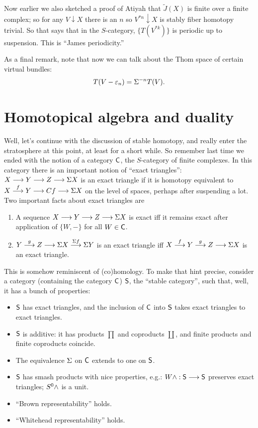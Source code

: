 Now earlier we also sketched a proof of Atiyah that $\widetilde J(X)$ is finite over a finite complex; so for any $V\downarrow X$ there is an $n$ so $V^{\ast n}\downarrow X$ is stably fiber homotopy trivial.  So that says that in the $S$-category, $\{T(V^{\ast k})\}$ is periodic up to suspension.  This is ``James periodicity.''

As a final remark, note that now we can talk about the Thom space of certain virtual bundles: \[T(V - \varepsilon_n) = \Sigma^{-n} T(V).\]

\fi
\BoxedNote{}
\section{Homotopical algebra and duality} %
\label{HomotopicalAlgebraAndDuality}
\ifx\OutputHomotopicalAlgebraAndDuality\undefined\else
Well, let's continue with the discussion of stable homotopy, and really enter the stratosphere at this point, at least for a short while.  So remember last time we ended with the notion of a category $\mathsf{C}$, the $S$-category of finite complexes.  In this category there is an important notion of ``exact triangles'': $X \longrightarrow Y \longrightarrow Z \longrightarrow \Sigma X$ is an exact triangle if it is homotopy equivalent to $X \stackrel{f}{\longrightarrow} Y \longrightarrow Cf \longrightarrow \Sigma X$ on the level of spaces, perhaps after suspending a lot.  Two important facts about exact triangles are
\begin{enumerate}
\item A sequence $X \longrightarrow Y \longrightarrow Z \longrightarrow \Sigma X$ is exact iff it remains exact after application of $\{W, -\}$ for all $W \in \mathsf{C}$.
\item $Y \stackrel{g}{\longrightarrow} Z \longrightarrow \Sigma X \stackrel{\Sigma f}{\longrightarrow} \Sigma Y$ is an exact triangle iff $X \stackrel{f}{\longrightarrow} Y \stackrel{g}{\longrightarrow} Z \longrightarrow \Sigma X$ is an exact triangle.
\end{enumerate}
This is somehow reminiscent of (co)homology. To make that hint precise, consider a category (containing the category $\mathsf{C}$) $\mathsf{S}$, the ``stable category'', such that, well, it has a bunch of properties:
\begin{itemize}
\item $\mathsf{S}$ has exact triangles, and the inclusion of $\mathsf{C}$ into $\mathsf{S}$ takes exact triangles to exact triangles.
\item $\mathsf{S}$ is additive: it has products $\prod$ and coproducts $\coprod$, and finite products and finite coproducts coincide.
\item The equivalence $\Sigma$ on $\mathsf{C}$ extends to one on $\mathsf{S}$.
\item $\mathsf{S}$ has smash products with nice properties, e.g.: $W \wedge: \mathsf{S} \longrightarrow \mathsf{S}$ preserves exact triangles; $S^0 \wedge$ is a unit.
\item ``Brown representability'' holds.
\item ``Whitehead representability'' holds.
\end{itemize}

